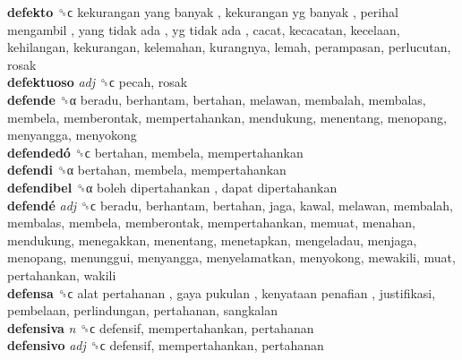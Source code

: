 \textbf{defekto} ␝ϲ   kekurangan yang banyak ,  kekurangan yg banyak ,  perihal mengambil ,  yang tidak ada ,  yg tidak ada , cacat, kecacatan, kecelaan, kehilangan, kekurangan, kelemahan, kurangnya, lemah, perampasan, perlucutan, rosak  \\
\textbf{defektuoso} \emph{adj}  ␝ϲ  pecah, rosak  \\
\textbf{defende} ␝α  beradu, berhantam, bertahan, melawan, membalah, membalas, membela, memberontak, mempertahankan, mendukung, menentang, menopang, menyangga, menyokong  \\
\textbf{defendedó} ␝ϲ  bertahan, membela, mempertahankan  \\
\textbf{defendi} ␝α  bertahan, membela, mempertahankan  \\
\textbf{defendibel} ␝α   boleh dipertahankan ,  dapat dipertahankan   \\
\textbf{defendé} \emph{adj}  ␝ϲ  beradu, berhantam, bertahan, jaga, kawal, melawan, membalah, membalas, membela, memberontak, mempertahankan, memuat, menahan, mendukung, menegakkan, menentang, menetapkan, mengeladau, menjaga, menopang, menunggui, menyangga, menyelamatkan, menyokong, mewakili, muat, pertahankan, wakili  \\
\textbf{defensa} ␝ϲ   alat pertahanan ,  gaya pukulan ,  kenyataan penafian , justifikasi, pembelaan, perlindungan, pertahanan, sangkalan  \\
\textbf{defensiva} \emph{n}  ␝ϲ  defensif, mempertahankan, pertahanan  \\
\textbf{defensivo} \emph{adj}  ␝ϲ  defensif, mempertahankan, pertahanan  \\
